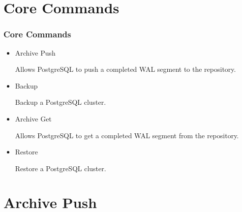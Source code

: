 \section{Core Commands}

\begin{frame}
    \frametitle{Core Commands}

    \begin{itemize}
        \item Archive Push \\\vspace{1em}

        Allows PostgreSQL to push a completed WAL segment to the repository.\pause\vspace{1em}

        \item Backup \\\vspace{1em}

        Backup a PostgreSQL cluster.\pause\vspace{1em}

        \item Archive Get \\\vspace{1em}

        Allows PostgreSQL to get a completed WAL segment from the repository.\pause\vspace{1em}

        \item Restore \\\vspace{1em}

        Restore a PostgreSQL cluster.
    \end{itemize}
\end{frame}

\section{Archive Push}

